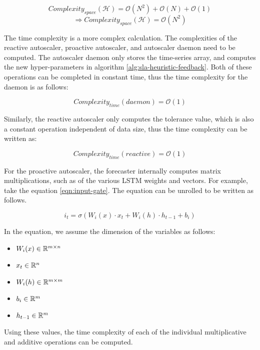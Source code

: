 \[Complexity_{space}(\mathcal{H}) = \mathcal{O}(N^2) + \mathcal{O}(N) + \mathcal{O}(1)\]
\begin{equation}
    \Rightarrow Complexity_{space}(\mathcal{H}) = \mathcal{O}(N^2)
\end{equation}

The time complexity is a more complex calculation. The complexities of the reactive autoscaler, proactive autoscaler, and autoscaler daemon need to be computed. The autoscaler daemon only stores the time-series array, and computes the new hyper-parameters in algorithm \ref{alg:sla-heuristic-feedback}. Both of these operations can be completed in constant time, thus the time complexity for the daemon is as follows:

\begin{equation}
    Complexity_{time}(daemon) = \mathcal{O}(1)
\end{equation}

Similarly, the reactive autoscaler only computes the tolerance value, which is also a constant operation independent of data size, thus the time complexity can be written as:

\begin{equation}
    Complexity_{time}(reactive) = \mathcal{O}(1)
\end{equation}

For the proactive autoscaler, the forecaster internally computes matrix multiplications, such as of the various LSTM weights and vectors. For example, take the equation \ref{eqn:input-gate}. The equation can be unrolled to be written as follows.

\begin{equation}
    i_{t} = \sigma(W_{i}(x) \cdot x_{t} + W_{i}(h) \cdot h_{t-1} + b_{i})
\end{equation}

In the equation, we assume the dimension of the variables as follows:

\begin{itemize}
    \item $W_{i}(x) \in \mathbb{R}^{m \times n}$
    \item $x_{t} \in \mathbb{R}^{n}$
    \item $W_{i}(h) \in \mathbb{R}^{m \times m}$
    \item $b_{i} \in \mathbb{R}^{m}$
    \item $h_{t-1} \in \mathbb{R}^{m}$
\end{itemize}

Using these values, the time complexity of each of the individual multiplicative and additive operations can be computed.

